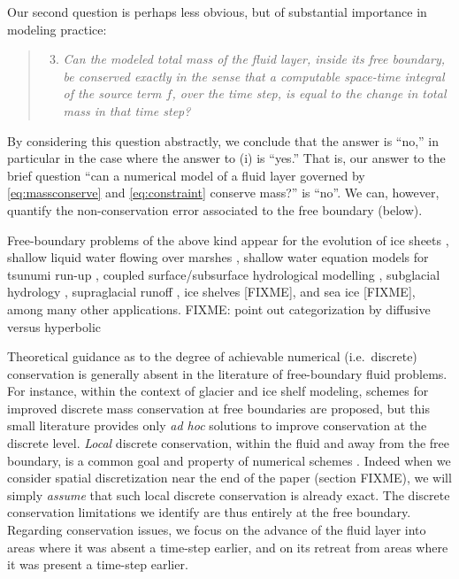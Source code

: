 \documentclass[final,leqno,onefignum,onetabnum]{siamltex1213bueler}
\begin{document}
Our second question is perhaps less obvious, but of substantial importance in modeling practice:
  \begin{quote}
  \renewcommand{\labelenumi}{(\roman{enumi})}
  \begin{enumerate}
  \setcounter{enumi}{2}
  \item \emph{Can the modeled total mass of the fluid layer, inside its free boundary, be conserved exactly in the sense that a computable space-time integral of the source term $f$, over the time step, is equal to the change in total mass in that time step?}
  \end{enumerate}
  \end{quote}
By considering this question abstractly, we conclude that the answer is ``no,'' in particular in the case where the answer to (i) is ``yes.''  That is, our answer to the brief question ``can a numerical model of a fluid layer governed by \eqref{eq:massconserve} and \eqref{eq:constraint} conserve mass?'' is ``no''.  We can, however, quantify the non-conservation error associated to the free boundary (below).

Free-boundary problems of the above kind appear for the evolution of ice sheets \cite{BLKCB,CDDSV,EgholmNielsen2010,JouvetBueler2012}, shallow liquid water flowing over marshes \cite{AlonsoSantillanaDawson}, shallow water equation models for tsunumi run-up \cite{LeVequeGeorge2008}, coupled surface/subsurface hydrological modelling \cite{Maxwelletal2014}, subglacial hydrology \cite{AschwandenBuelerKhroulevBlatter,BuelervanPeltDRAFT,Schoofetal2012}, supraglacial runoff \cite{AschwandenBuelerKhroulevBlatter}, ice shelves [FIXME], and sea ice [FIXME], among many other applications.  FIXME: point out categorization by diffusive versus hyperbolic

Theoretical guidance as to the degree of achievable numerical (i.e.~discrete) conservation is generally absent in the literature of free-boundary fluid problems.  For instance, within the context of glacier \cite{JaroschSchoofAnslow2013} and ice shelf \cite{Albrechtetal2011} modeling, schemes for improved discrete mass conservation at free boundaries are proposed, but this small literature provides only \emph{ad hoc} solutions to improve conservation at the discrete level.  \emph{Local} discrete conservation, within the fluid and away from the free boundary, is a common goal and property of numerical schemes \cite{LeVeque}.  Indeed when we consider spatial discretization near the end of the paper (section FIXME), we will simply \emph{assume} that such local discrete conservation is already exact.  The discrete conservation limitations we identify are thus entirely at the free boundary.  Regarding conservation issues, we focus on the advance of the fluid layer into areas where it was absent a time-step earlier, and on its retreat from areas where it was present a time-step earlier.
\end{document}
